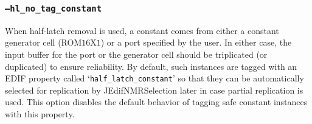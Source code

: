 \subsubsection{\texttt{--hl\_no\_tag\_constant}}
When half-latch removal is used, a constant comes from either a
constant generator cell (ROM$16$X$1$) or a port specified by the
user. In either case, the input buffer for the port or the generator
cell should be triplicated (or duplicated) to ensure reliability. By
default, such instances are tagged with an EDIF property called
`\texttt{half\_latch\_constant}' so that they can be automatically
selected for replication by JEdifNMRSelection later in case partial
replication is used. This option disables the default behavior of
tagging safe constant instances with this property.





%
%



